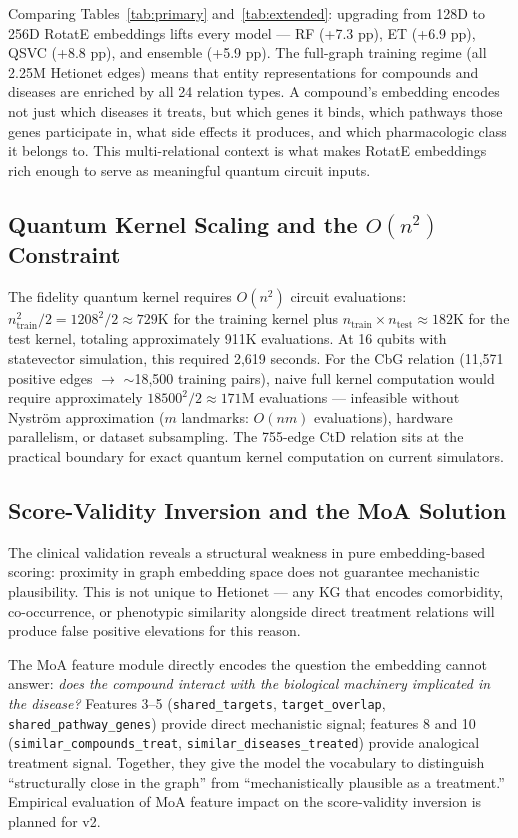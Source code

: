 \documentclass[twocolumn,10pt]{article}
\begin{document}
Comparing Tables~\ref{tab:primary} and~\ref{tab:extended}: upgrading from 128D to 256D RotatE embeddings lifts every model --- RF (+7.3 pp), ET (+6.9 pp), QSVC (+8.8 pp), and ensemble (+5.9 pp). The full-graph training regime (all 2.25M Hetionet edges) means that entity representations for compounds and diseases are enriched by all 24 relation types. A compound's embedding encodes not just which diseases it treats, but which genes it binds, which pathways those genes participate in, what side effects it produces, and which pharmacologic class it belongs to. This multi-relational context is what makes RotatE embeddings rich enough to serve as meaningful quantum circuit inputs.

\subsection{Quantum Kernel Scaling and the \texorpdfstring{$O(n^2)$}{O(n-squared)} Constraint}

The fidelity quantum kernel requires $O(n^2)$ circuit evaluations: $n_{\text{train}}^2 / 2 = 1208^2/2 \approx 729\text{K}$ for the training kernel plus $n_{\text{train}} \times n_{\text{test}} \approx 182\text{K}$ for the test kernel, totaling approximately 911K evaluations. At 16 qubits with statevector simulation, this required 2,619 seconds. For the CbG relation (11,571 positive edges $\to$ ${\sim}$18,500 training pairs), naive full kernel computation would require approximately $18500^2/2 \approx 171\text{M}$ evaluations --- infeasible without Nystr\"{o}m approximation ($m$ landmarks: $O(nm)$ evaluations), hardware parallelism, or dataset subsampling. The 755-edge CtD relation sits at the practical boundary for exact quantum kernel computation on current simulators.

\subsection{Score-Validity Inversion and the MoA Solution}

The clinical validation reveals a structural weakness in pure embedding-based scoring: proximity in graph embedding space does not guarantee mechanistic plausibility. This is not unique to Hetionet --- any KG that encodes comorbidity, co-occurrence, or phenotypic similarity alongside direct treatment relations will produce false positive elevations for this reason.

The MoA feature module directly encodes the question the embedding cannot answer: \textit{does the compound interact with the biological machinery implicated in the disease?} Features 3--5 (\texttt{shared\_targets}, \texttt{target\_overlap}, \texttt{shared\_pathway\_genes}) provide direct mechanistic signal; features 8 and 10 (\texttt{similar\_compounds\_treat}, \texttt{similar\_diseases\_treated}) provide analogical treatment signal. Together, they give the model the vocabulary to distinguish ``structurally close in the graph'' from ``mechanistically plausible as a treatment.'' Empirical evaluation of MoA feature impact on the score-validity inversion is planned for v2.
\end{document}
